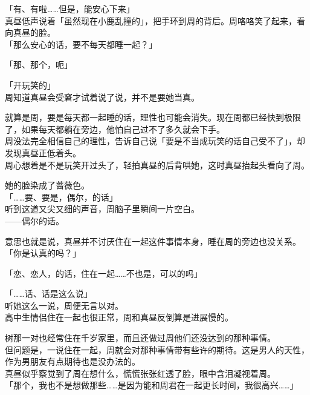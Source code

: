 「有、有啦……但是，能安心下来」\\

真昼低声说着「虽然现在小鹿乱撞的」，把手环到周的背后。周咯咯笑了起来，看向真昼的脸。\\

「那么安心的话，要不每天都睡一起？」

「那、那个，呃」

「开玩笑的」\\

周知道真昼会受窘才试着说了说，并不是要她当真。

就算是周，要是每天都一起睡的话，理性也可能会消失。现在周都已经快到极限了，如果每天都躺在旁边，他怕自己过不了多久就会下手。\\

周没法完全相信自己的理性，告诉自己说「要是不当成玩笑的话自己受不了」，却发现真昼正低着头。\\

周心想着是不是玩笑开过头了，轻拍真昼的后背哄她，这时真昼抬起头看向了周。

她的脸染成了蔷薇色。\\

「……要、要是，偶尔，的话」\\

听到这道又尖又细的声音，周脑子里瞬间一片空白。\\

——偶尔的话。

意思也就是说，真昼并不讨厌住在一起这件事情本身，睡在周的旁边也没关系。\\

「你是认真的吗？」

「恋、恋人，的话，住在一起……不也是，可以的吗」

「……话、话是这么说」\\

听她这么一说，周便无言以对。\\

高中生情侣住在一起也很正常，周和真昼反倒算是进展慢的。

树那一对也经常住在千岁家里，而且还做过周他们还没达到的那种事情。\\

但问题是，一说住在一起，周就会对那种事情带有些许的期待。这是男人的天性，作为男朋友有点期待也是没办法的。\\

真昼似乎察觉到了周在想什么，慌慌张张红透了脸，眼中含泪凝视着周。\\

「那个，我也不是想做那些……是因为能和周君在一起更长时间，我很高兴……」

